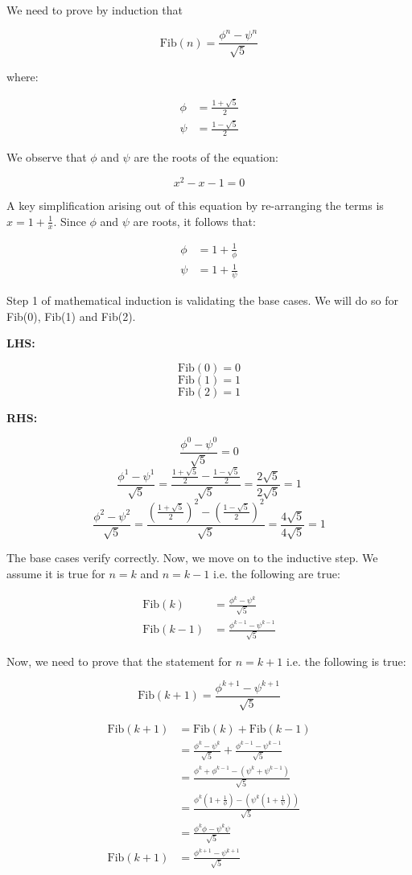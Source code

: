 \documentclass[a4paper]{article}
\begin{document}
	We need to prove by induction that
	
	\[
	\text{Fib}(n)=\frac{\phi^n-\psi^n}{\sqrt{5}}
	\]
	
	where:
	
	\[
	\begin{split}
	\phi&=\frac{1+\sqrt{5}}{2}\\	
	\psi&=\frac{1-\sqrt{5}}{2}
	\end{split}
	\]
	
	We observe that $\phi$ and $\psi$ are the roots of the equation: 
	
	\[x^2-x-1=0\]
	
	A key simplification arising out of this equation by re-arranging the terms is $x=1+\frac{1}{x}$. Since $\phi$ and $\psi$ are roots, it follows that:
	
	\[
	\begin{split}
	\phi&=1+\frac{1}{\phi}\\	
	\psi&=1+\frac{1}{\psi}
	\end{split}
	\]
	
	Step 1 of mathematical induction is validating the base cases. We will do so for Fib(0), Fib(1) and Fib(2).
	
	\textbf{LHS:}
	
	\[\text{Fib}(0)=0\]
	\[\text{Fib}(1)=1\]
	\[\text{Fib}(2)=1\]
	
	\textbf{RHS:}
	
	\[\frac{\phi^0-\psi^0}{\sqrt{5}}=0\]
	\[\frac{\phi^1-\psi^1}{\sqrt{5}}=\frac{\frac{1+\sqrt{5}}{2}-\frac{1-\sqrt{5}}{2}}{\sqrt{5}}=\frac{2\sqrt{5}}{2\sqrt{5}}=1\]
	\[\frac{\phi^2-\psi^2}{\sqrt{5}}=\frac{\left(\frac{1+\sqrt{5}}{2}\right)^2-\left(\frac{1-\sqrt{5}}{2}\right)^2}{\sqrt{5}}=\frac{4\sqrt{5}}{4\sqrt{5}}=1\]
	
	The base cases verify correctly. Now, we move on to the inductive step. We assume it is true for $n=k$ and $n=k-1$ i.e. the following are true:
	
	\[
	\begin{split}
	\text{Fib}(k)&=\frac{\phi^k-\psi^k}{\sqrt{5}}\\
	\text{Fib}(k-1)&=\frac{\phi^{k-1}-\psi^{k-1}}{\sqrt{5}}
	\end{split}
	\]
	
	Now, we need to prove that the statement for $n=k+1$ i.e. the following is true:
	
	\[\text{Fib}(k+1)=\frac{\phi^{k+1}-\psi^{k+1}}{\sqrt{5}}\]
	
	\[
	\begin{split}
	\text{Fib}(k+1)&=\text{Fib}(k)+\text{Fib}(k-1)\\
	&=\frac{\phi^k-\psi^k}{\sqrt{5}}+\frac{\phi^{k-1}-\psi^{k-1}}{\sqrt{5}}\\
	&=\frac{\phi^k+\phi^{k-1}-(\psi^k+\psi^{k-1})}{\sqrt{5}}\\
	&=\frac{\phi^k\left(1+\frac{1}{\phi}\right)-\left(\psi^k\left(1+\frac{1}{\psi}\right)\right)}{\sqrt{5}}\\
	&=\frac{\phi^k\phi-\psi^k\psi}{\sqrt{5}}\\
	\text{Fib}(k+1)&=\frac{\phi^{k+1}-\psi^{k+1}}{\sqrt{5}}
	\end{split}
	\]
	
\end{document}
